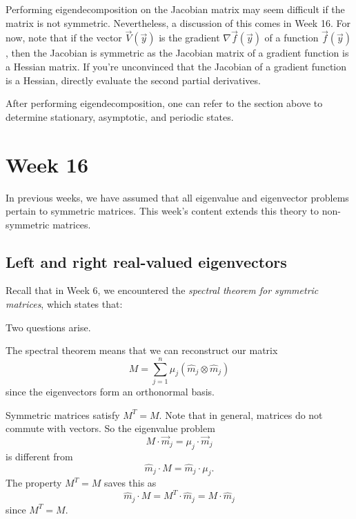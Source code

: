 \documentclass[a4paper, 12pt,oneside,openany]{book}
\begin{document}
Performing eigendecomposition on the Jacobian matrix may seem difficult if the matrix is not symmetric. Nevertheless, a discussion of this comes in Week 16. For now, note that if the vector $\vec{V}(\vec{y})$ is the gradient $\nabla \vec{f}(\vec{y})$ of a function $\vec{f}(\vec{y})$, then the Jacobian is symmetric as the Jacobian matrix of a gradient function is a Hessian matrix. If you're unconvinced that the Jacobian of a gradient function is a Hessian, directly evaluate the second partial derivatives.

After performing eigendecomposition, one can refer to the section above to determine stationary, asymptotic, and periodic states. 

\chapter{Week 16}

In previous weeks, we have assumed that all eigenvalue and eigenvector problems pertain to symmetric matrices. This week's content extends this theory to non-symmetric matrices. 

\section{Left and right real-valued eigenvectors}

Recall that in Week 6, we encountered the \emph{spectral theorem for symmetric matrices}, which states that:


Two questions arise. 

 The spectral theorem means that we can reconstruct our matrix $$M=\sum\limits_{j=1}^n \mu_j (\hat{m}_j \otimes \hat{m}_j)$$ since the eigenvectors form an orthonormal basis.

 Symmetric matrices satisfy $M^T=M$. Note that in general, matrices do not commute with vectors. So the eigenvalue problem $$M \cdot \vec{m}_j = \mu_j \cdot \vec{m}_j$$ is different from $$\hat{m}_j \cdot M= \hat{m}_j \cdot \mu_j.$$ The property $M^T=M$ saves this as $$\hat{m}_j \cdot M = M^T \cdot \hat{m}_j = M \cdot \hat{m}_j$$ since $M^T=M$. 
\end{document}
